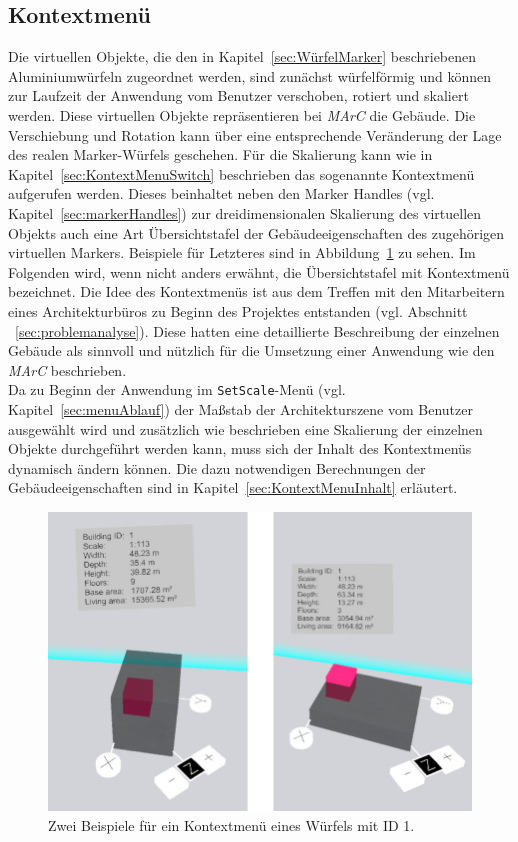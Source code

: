 \subsection{Kontextmenü}\label{sec:kontextMenu}%
Die virtuellen Objekte, die den in Kapitel~\ref{sec:WürfelMarker} beschriebenen Aluminiumwürfeln zugeordnet werden, sind zunächst würfelförmig und können zur Laufzeit der Anwendung vom Benutzer verschoben, rotiert und skaliert werden. Diese virtuellen Objekte repräsentieren bei \emph{MArC} die Gebäude. Die Verschiebung und Rotation kann über eine entsprechende Veränderung der Lage des realen Marker-Würfels geschehen. Für die Skalierung kann wie in Kapitel~\ref{sec:KontextMenuSwitch} beschrieben das sogenannte Kontextmenü aufgerufen werden. Dieses beinhaltet neben den Marker Handles (vgl. Kapitel~\ref{sec:markerHandles}) zur dreidimensionalen Skalierung des virtuellen Objekts auch eine Art Übersichtstafel der Gebäudeeigenschaften des zugehörigen virtuellen Markers. Beispiele für Letzteres sind in Abbildung~\ref{fig:KontextmenuExamples} zu sehen. Im Folgenden wird, wenn nicht anders erwähnt, die Übersichtstafel mit \glqq Kontextmenü\grqq{} bezeichnet. Die Idee des Kontextmenüs ist aus dem Treffen mit den Mitarbeitern eines Architekturbüros zu Beginn des Projektes entstanden (vgl. Abschnitt ~\ref{sec:problemanalyse}). Diese hatten eine detaillierte Beschreibung der einzelnen Gebäude als sinnvoll und nützlich für die Umsetzung einer Anwendung wie den \textit{MArC} beschrieben.\\
Da zu Beginn der Anwendung im \texttt{SetScale}-Menü (vgl. Kapitel~\ref{sec:menuAblauf}) der Maßstab der Architekturszene vom Benutzer ausgewählt wird und zusätzlich wie beschrieben eine Skalierung der einzelnen Objekte durchgeführt werden kann, muss sich der Inhalt des Kontextmenüs dynamisch ändern können. Die dazu notwendigen Berechnungen der Gebäudeeigenschaften sind in Kapitel~\ref{sec:KontextMenuInhalt} erläutert. 

\begin{figure}[H]
	\centering
	\includegraphics[scale=.3]{Bilder/Eigene Fotos/KontextMenue.jpg}
	\caption[Zwei Beispiele für ein Kontextmenü eines Würfels mit ID 1]{Zwei Beispiele für ein Kontextmenü eines Würfels mit ID 1.}
	\label{fig:KontextmenuExamples}
\end{figure}

